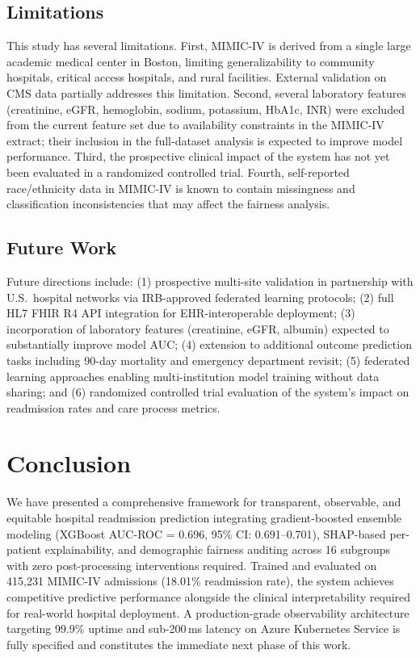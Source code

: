 \documentclass[11pt,letterpaper]{article}
\begin{document}
\subsection{Limitations}

This study has several limitations. First, MIMIC-IV is derived from a single large academic medical center in Boston, limiting generalizability to community hospitals, critical access hospitals, and rural facilities. External validation on CMS data partially addresses this limitation. Second, several laboratory features (creatinine, eGFR, hemoglobin, sodium, potassium, HbA1c, INR) were excluded from the current feature set due to availability constraints in the MIMIC-IV extract; their inclusion in the full-dataset analysis is expected to improve model performance. Third, the prospective clinical impact of the system has not yet been evaluated in a randomized controlled trial. Fourth, self-reported race/ethnicity data in MIMIC-IV is known to contain missingness and classification inconsistencies that may affect the fairness analysis.

\subsection{Future Work}

Future directions include: (1) prospective multi-site validation in partnership with U.S.\ hospital networks via IRB-approved federated learning protocols; (2) full HL7 FHIR R4 API integration for EHR-interoperable deployment; (3) incorporation of laboratory features (creatinine, eGFR, albumin) expected to substantially improve model AUC; (4) extension to additional outcome prediction tasks including 90-day mortality and emergency department revisit; (5) federated learning approaches enabling multi-institution model training without data sharing; and (6) randomized controlled trial evaluation of the system's impact on readmission rates and care process metrics.

\section{Conclusion}
\label{sec:conclusion}

We have presented a comprehensive framework for transparent, observable, and equitable hospital readmission prediction integrating gradient-boosted ensemble modeling (XGBoost AUC-ROC = 0.696, 95\% CI: 0.691--0.701), SHAP-based per-patient explainability, and demographic fairness auditing across 16 subgroups with zero post-processing interventions required. Trained and evaluated on 415,231 MIMIC-IV admissions (18.01\% readmission rate), the system achieves competitive predictive performance alongside the clinical interpretability required for real-world hospital deployment. A production-grade observability architecture targeting 99.9\% uptime and sub-200\,ms latency on Azure Kubernetes Service is fully specified and constitutes the immediate next phase of this work.
\end{document}
